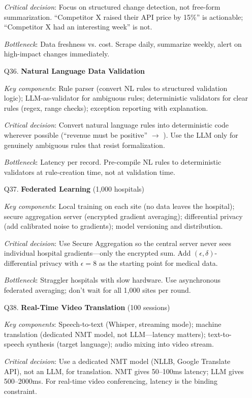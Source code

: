 \begin{enumerate}[leftmargin=*]
    \textit{Critical decision}: Focus on structured change detection, not free-form summarization. ``Competitor X raised their API price by 15\%'' is actionable; ``Competitor X had an interesting week'' is not.

    \textit{Bottleneck}: Data freshness vs. cost. Scrape daily, summarize weekly, alert on high-impact changes immediately.

    \item[Q36.] \textbf{Natural Language Data Validation}

    \textit{Key components}: Rule parser (convert NL rules to structured validation logic); LLM-as-validator for ambiguous rules; deterministic validators for clear rules (regex, range checks); exception reporting with explanation.

    \textit{Critical decision}: Convert natural language rules into deterministic code wherever possible (``revenue must be positive'' $\to$ ). Use the LLM only for genuinely ambiguous rules that resist formalization.

    \textit{Bottleneck}: Latency per record. Pre-compile NL rules to deterministic validators at rule-creation time, not at validation time.

    \item[Q37.] \textbf{Federated Learning} (1,000 hospitals)

    \textit{Key components}: Local training on each site (no data leaves the hospital); secure aggregation server (encrypted gradient averaging); differential privacy (add calibrated noise to gradients); model versioning and distribution.

    \textit{Critical decision}: Use Secure Aggregation so the central server never sees individual hospital gradients---only the encrypted sum. Add $(\epsilon, \delta)$-differential privacy with $\epsilon = 8$ as the starting point for medical data.

    \textit{Bottleneck}: Straggler hospitals with slow hardware. Use asynchronous federated averaging; don't wait for all 1,000 sites per round.

    \item[Q38.] \textbf{Real-Time Video Translation} (100 sessions)

    \textit{Key components}: Speech-to-text (Whisper, streaming mode); machine translation (dedicated NMT model, not LLM---latency matters); text-to-speech synthesis (target language); audio mixing into video stream.

    \textit{Critical decision}: Use a dedicated NMT model (NLLB, Google Translate API), not an LLM, for translation. NMT gives 50--100ms latency; LLM gives 500--2000ms. For real-time video conferencing, latency is the binding constraint.


\end{enumerate}
